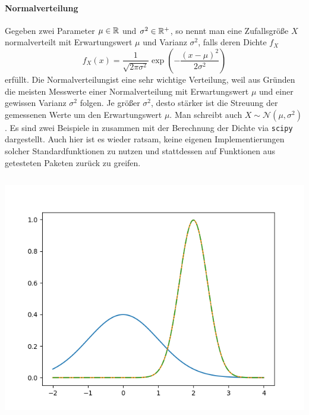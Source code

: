 \paragraph{Normalverteilung}
Gegeben zwei Parameter $\mu \in \mathbb{R}$ und $\sigma^2 \in \mathbb{R}^+$, so nennt man eine Zufallsgröße $X$ normalverteilt mit Erwartungswert $\mu$ und Varianz $\sigma^2$, falls deren Dichte $f_X$
\[
f_X(x) = \frac{1}{\sqrt{2 \pi \sigma^2}} \exp\left(-\frac{(x - \mu)^2}{2 \sigma^2}\right)
\]
erfüllt.
Die Normalverteilungist eine sehr wichtige Verteilung, weil aus Gründen die meisten Messwerte einer Normalverteilung mit Erwartungswert $\mu$ und einer gewissen Varianz $\sigma^2$ folgen.
Je größer $\sigma^2$, desto stärker ist die Streuung der gemessenen Werte um den Erwartungswert $\mu$.
Man schreibt auch $X \sim \mathcal{N}(\mu, \sigma^2)$.
Es sind zwei Beispiele in  zusammen mit der Berechnung der Dichte via \texttt{scipy} dargestellt.
Auch hier ist es wieder ratsam, keine eigenen Implementierungen solcher Standardfunktionen zu nutzen und stattdessen auf Funktionen aus getesteten Paketen zurück zu greifen.
\begin{listing}[ht]
    \noindent
    \begin{minipage}{0.51\textwidth}
        \strut\vspace*{-\baselineskip}\newline
        \inputminted[firstline=3, lastline=10]{python3}{code/random/normal1.py}
    \end{minipage}%
    \begin{minipage}{0.48\textwidth}
        \strut\vspace*{-\baselineskip}\newline
        \includegraphics[width=\textwidth]{code/random/normal1.png}
    \end{minipage}
    \label{py:random:normal1}
\end{listing}
%
%
